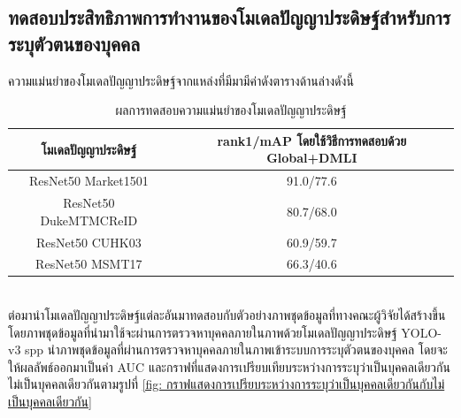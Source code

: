 \subsection{ทดสอบประสิทธิภาพการทำงานของโมเดลปัญญาประดิษฐ์สำหรับการระบุตัวตนของบุคคล}
\label{sec:reid_ex}
ความแม่นยำของโมเดลปัญญาประดิษฐ์จากแหล่งที่มีมามีค่าดังตารางด้านล่างดังนี้
\begin{table}[!ht]
    \centering
    \begin{tabular}{|c|c|}
            \hline
            {โมเดลปัญญาประดิษฐ์}&{rank1/mAP โดยใช้วิธีการทดสอบด้วย Global+DMLI}				\\
            \hline
            ResNet50 Market1501	 			& 91.0/77.6								\\
            ResNet50 DukeMTMCReID			& 80.7/68.0								\\
            ResNet50 CUHK03				& 60.9/59.7								\\
            ResNet50 MSMT17				& 66.3/40.6								\\
        \hline
    \end{tabular}
    \caption{ผลการทดสอบความแม่นยำของโมเดลปัญญาประดิษฐ์}
    \label{tab: Accuracy of model ReID}
\end{table}
\\
ต่อมานำโมเดลปัญญาประดิษฐ์แต่ละอันมาทดสอบกับตัวอย่างภาพชุดข้อมูลที่ทางคณะผู้วิจัยได้สร้างขึ้น โดยภาพชุดข้อมูลที่นำมาใช้จะผ่านการตรวจหาบุคคลภายในภาพด้วยโมเดลปัญญาประดิษฐ์ YOLO-v3 spp นำภาพชุดข้อมูลที่ผ่านการตรวจหาบุคคลภายในภาพเข้าระบบการระบุตัวตนของบุคคล โดยจะให้ผลลัพธ์ออกมาเป็นค่า AUC และกราฟที่แสดงการเปรียบเทียบระหว่างการระบุว่าเป็นบุคคลเดียวกันไม่เป็นบุคคลเดียวกันตามรูปที่ \ref{fig: กราฟแสดงการเปรียบระหว่างการระบุว่าเป็นบุคคลเดียวกันกับไม่เป็นบุคคลเดียวกัน}


